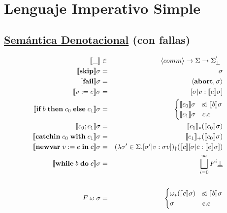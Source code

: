 \section{Lenguaje Imperativo Simple}
\subsection*{\underline{Semántica Denotacional} (con fallas)}
      \begin{multicols}{2}
        \begin{eqnarray*}
          \semAGU{\_} &\in& \lang{comm} \rightarrow \Sigma \rightarrow \Sigma^{'}_{\bot} \\
          \semsAGU{\skipp} &=& \sigma \\
          \semsAGU{\fail} &=& \lang{\abort, \sigma} \\
          \semsAGU{v := e} &=& [\sigma | v : \semsAGU{e}] \\
          \semsAGU{\ifthenelse{b}{c_{0}}{c_{1}}} &=& \begin{cases}
                                                    \semsAGU{c_0} & \text{si } \semsAGU{b} \\
                                                    \semsAGU{c_1} & c.c \\
                                                  \end{cases}\\
          \semsAGU{c_{0};c_{1}} &=& \semAGU{c_{1}}_{\ast} (\semsAGU{c_{0}}) \\
          \semsAGU{\catch{c_{0}}{c_{1}}} &=& \semAGU{c_{1}}_{+} (\semsAGU{c_{0}}) \\
          \semsAGU{\newvar{ v:=e}{c}} &=& (\lambda \sigma' \in \Sigma. [\sigma' | v:\sigma v])_{\dag} (\semAGU{c}[\sigma|c:\semsAGU{e}]) \\
          \semsAGU{\while{b}{c}} &=& \SUP F^{i} \bottom \\ \\
          F \;\omega\;\sigma &=& \begin{cases}
                                  \omega_{\ast}(\semsAGU{c}) & \text{si } \semsAGU{b} \\
                                  \sigma & \text{c.c}
                                \end{cases}
          \end{eqnarray*}


\end{multicols}
